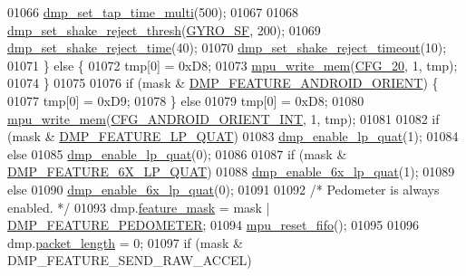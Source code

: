 \begin{DoxyCode}
01066         \hyperlink{group___d_r_i_v_e_r_s_gaeca250a90eb816eb2609229849481337}{dmp\_set\_tap\_time\_multi}(500);
01067 
01068         \hyperlink{group___d_r_i_v_e_r_s_ga62efdae1330d5bcaf4c75b069ded0ed0}{dmp\_set\_shake\_reject\_thresh}(\hyperlink{group___d_r_i_v_e_r_s_gac0325c658f2911bdfc3b44fca31c684f}{GYRO\_SF}, 200);
01069         \hyperlink{group___d_r_i_v_e_r_s_ga09d7a6d90e1bd2e907f1866d850c5608}{dmp\_set\_shake\_reject\_time}(40);
01070         \hyperlink{group___d_r_i_v_e_r_s_ga5d44d1a32535000e6902cdc5224d1b54}{dmp\_set\_shake\_reject\_timeout}(10);
01071     \} \textcolor{keywordflow}{else} \{
01072         tmp[0] = 0xD8;
01073         \hyperlink{group___d_r_i_v_e_r_s_gafea59910bc3dd30ba3356b1c75213a5f}{mpu\_write\_mem}(\hyperlink{group___d_r_i_v_e_r_s_ga12aa4c3bdc65c24ca29ef08e62fd3e13}{CFG\_20}, 1, tmp);
01074     \}
01075 
01076     \textcolor{keywordflow}{if} (mask & \hyperlink{group___d_r_i_v_e_r_s_gaf2b250fc928390d562f7bd80300ce419}{DMP\_FEATURE\_ANDROID\_ORIENT}) \{
01077         tmp[0] = 0xD9;
01078     \} \textcolor{keywordflow}{else}
01079         tmp[0] = 0xD8;
01080     \hyperlink{group___d_r_i_v_e_r_s_gafea59910bc3dd30ba3356b1c75213a5f}{mpu\_write\_mem}(\hyperlink{group___d_r_i_v_e_r_s_gacc91af9a664cf438b93a3faa108bb603}{CFG\_ANDROID\_ORIENT\_INT}, 1, tmp);
01081 
01082     \textcolor{keywordflow}{if} (mask & \hyperlink{group___d_r_i_v_e_r_s_gabf442c0477f8f7704a8094519ddfe38e}{DMP\_FEATURE\_LP\_QUAT})
01083         \hyperlink{group___d_r_i_v_e_r_s_ga4ee4339b79a58558d121ba8206056394}{dmp\_enable\_lp\_quat}(1);
01084     \textcolor{keywordflow}{else}
01085         \hyperlink{group___d_r_i_v_e_r_s_ga4ee4339b79a58558d121ba8206056394}{dmp\_enable\_lp\_quat}(0);
01086 
01087     \textcolor{keywordflow}{if} (mask & \hyperlink{group___d_r_i_v_e_r_s_gae879a3c9729f9e1be5e6d7c9211c69c0}{DMP\_FEATURE\_6X\_LP\_QUAT})
01088         \hyperlink{group___d_r_i_v_e_r_s_gaac712ef33727433f666b3861894873be}{dmp\_enable\_6x\_lp\_quat}(1);
01089     \textcolor{keywordflow}{else}
01090         \hyperlink{group___d_r_i_v_e_r_s_gaac712ef33727433f666b3861894873be}{dmp\_enable\_6x\_lp\_quat}(0);
01091 
01092     \textcolor{comment}{/* Pedometer is always enabled. */}
01093     dmp.\hyperlink{structdmp__s_ac1c048fa56b613b3223d2e66ac2c050f}{feature\_mask} = mask | \hyperlink{group___d_r_i_v_e_r_s_gabcf6a5bc9703782d711d0c6ba92ade85}{DMP\_FEATURE\_PEDOMETER};
01094     \hyperlink{group___d_r_i_v_e_r_s_gaf23e9f57c0059be6ec57862f0584de10}{mpu\_reset\_fifo}();
01095 
01096     dmp.\hyperlink{structdmp__s_a6423143ff761c75d97f34c8465393ea0}{packet\_length} = 0;
01097     \textcolor{keywordflow}{if} (mask & DMP\_FEATURE\_SEND\_RAW\_ACCEL)

\end{DoxyCode}
